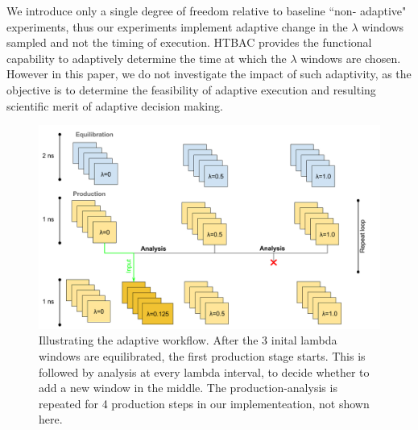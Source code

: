 

We introduce only a single degree of freedom relative to baseline ``non-
adaptive" experiments, thus our experiments implement adaptive change in the
$\lambda$ windows sampled and not the timing of execution. HTBAC provides the functional
capability to adaptively determine the time at which the $\lambda$ windows are
chosen. However in this paper, we do not investigate the impact of such
adaptivity, as the objective is to determine the feasibility of adaptive
execution and resulting scientific merit of adaptive decision making.



\begin{figure}
  \centering
   \includegraphics[width=\columnwidth]{figures/Adaptive_TIES_1.png}
  \caption{Illustrating the adaptive workflow. After the 3 inital lambda windows are equilibrated, the first production stage starts. This is followed by analysis at every lambda interval, to decide whether to add a new window in the middle. The production-analysis is repeated for 4 production steps in our implementeation, not shown here.}
\label{fig:adaptive_TIES}
\end{figure}

